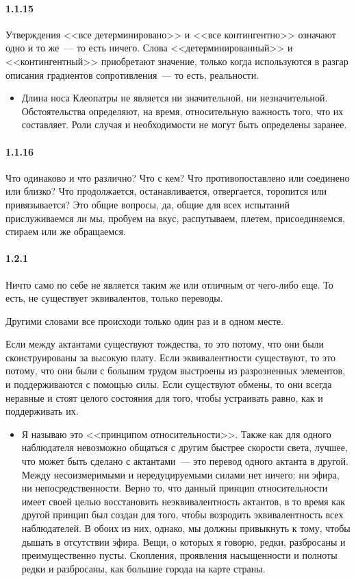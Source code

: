\paragraph{1.1.15}\hypertarget{par:1.1.15}{} Утверждения <<все детерминировано>> и <<все контингентно>> означают одно и то же~--- то есть ничего. Слова <<детерминированный>> и <<контингентный>> приобретают
значение, только когда используются в разгар описания градиентов сопротивления~--- то есть, реальности.
	\begin{itemize}
	\item Длина носа Клеопатры не является ни значительной, ни незначительной. Обстоятельства определяют, на время, относительную важность того, что их составляет. Роли случая и необходимости не могут быть определены заранее.

	\end{itemize}

\paragraph{1.1.16}\hypertarget{par:1.1.16}{} Что одинаково и что различно? Что с кем? Что противопоставлено или соединено или близко? Что продолжается, останавливается, отвергается, торопится или привязывается? Это общие вопросы, да, общие для всех испытаний прислуживаемся ли мы, пробуем на вкус, распутываем, плетем, присоединяемся, стираем или же обращаемся.

\paragraph{1.2.1}\hypertarget{par:1.2.1}{} Ничто само по себе не является таким же или отличным от чего-либо еще. То есть, не существует эквивалентов, только переводы.

Другими словами все происходи только один раз и в одном месте.

Если между актантами существуют тождества, то это потому, что они были сконструированы за высокую плату. Если эквивалентности существуют, то это потому, что они были с большим трудом выстроены из разрозненных элементов, и поддерживаются с помощью силы. Если существуют обмены, то они всегда неравные и стоят целого состояния для того, чтобы устраивать равно, как и поддерживать их.
	\begin{itemize}
	\item Я называю это <<принципом относительности>>. Также как для одного наблюдателя невозможно общаться с другим быстрее скорости света, лучшее, что может быть сделано с актантами~--- это перевод одного актанта в другой. Между несоизмеримыми и нередуцируемыми силами нет ничего: ни эфира, ни непосредственности. Верно то, что данный принцип относительности имеет своей целью восстановить неэквивалентность актантов, в то время как другой принцип был создан для того, чтобы возродить эквивалентность всех наблюдателей. В обоих из них, однако, мы должны привыкнуть к тому, чтобы дышать в отсутствии эфира. Вещи, о которых я говорю, редки, разбросаны и преимущественно пусты. Скопления, проявления насыщенности и полноты редки и разбросаны, как большие города на карте страны.

	\end{itemize}

